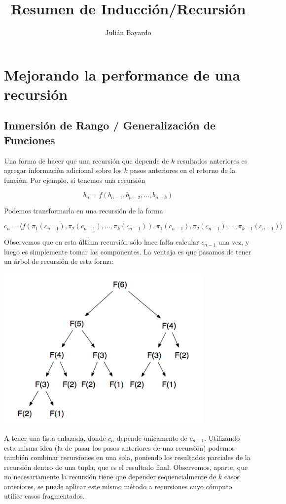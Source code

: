 \documentclass[10pt,a4paper,notitlepage]{article}
\author{Julián Bayardo}
\title{Resumen de Inducción/Recursión}
\begin{document}
\section{Mejorando la performance de una recursión}

\subsection{Inmersión de Rango / Generalización de Funciones}

Una forma de hacer que una recursión que depende de $k$ resultados anteriores es agregar información adicional sobre los $k$ pasos anteriores en el retorno de la función. Por ejemplo, si tenemos una recursión

$$b_n = f(b_{n-1}, b_{n-2}, ..., b_{n-k})$$

Podemos transformarla en una recursión de la forma

$$c_n = \langle f(\pi_1(c_{n-1}), \pi_2(c_{n-1}), ..., \pi_k(c_{n-1})), \pi_1(c_{n-1}), \pi_2(c_{n-1}), ..., \pi_{k-1}(c_{n-1}) \rangle$$

Observemos que en esta última recursión sólo hace falta calcular $c_{n-1}$ una vez, y luego es simplemente tomar las componentes. La ventaja es que pasamos de tener un árbol de recursión de esta forma:

\includegraphics[width=0.8\textwidth]{Fib_Rec_Tree.png}

A tener una lista enlazada, donde $c_n$ depende unicamente de $c_{n-1}$. Utilizando esta misma idea (la de pasar los pasos anteriores de una recursión) podemos también combinar recursiones en una sola, poniendo los resultados parciales de la recursión dentro de una tupla, que es el resultado final. Observemos, aparte, que no necesariamente la recursión tiene que depender sequencialmente de $k$ casos anteriores, se puede aplicar este mismo método a recursiones cuyo cómputo utilice casos fragmentados.
\end{document}
